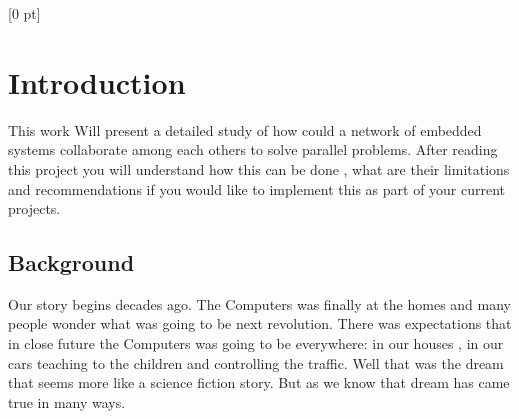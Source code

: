 
\titlespacing{\chapter}{0 pt}{30 pt}{50 pt}[0 pt]
\titleformat{\section}{\Large\bfseries}{\thesection}{0 pt}{\hspace{30 pt}}
\titleformat{\subsection}{\large\bfseries}{\thesubsection}{0 pt}{\hspace{30 pt}}
\pagestyle{fancy}
\fancyhead[LO,LE]{\footnotesize\textit{\leftmark}}
\fancyhead[RO,RE]{\thepage}
\fancyfoot[CO,CE]{}

\chapter{Introduction} %

\normalsize

This work Will present a detailed study of how could a network of embedded
systems collaborate among each others to solve parallel problems. After reading
this project you will understand how this can be done , what are their
limitations and recommendations if you would like to implement this as part of 
your current projects. 

\section{Background}
\vspace{30 pt}
\noindent

Our story begins decades ago. The Computers was finally at the homes and many
people wonder what was going to be next revolution. There was expectations that
in close future the Computers was going to be everywhere: in our houses , in
our cars teaching to the children and controlling the traffic. Well that was
the dream that seems more like a science fiction story. But as we know that
dream has came true in many ways.

